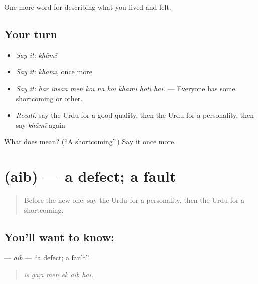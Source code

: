 \begin{grammarlens}[title={What you've built}]
One more word for describing what you lived and felt.
\end{grammarlens}

\subsection*{Your turn}
\begin{itemize}
\raggedright
  \item \emph{Say it:} \emph{khāmī}
  \item \emph{Say it:} \emph{khāmī}, once more
  \item \emph{Say it:} \emph{har insān meṅ koī na koī khāmī hotī hai.} — Everyone has some shortcoming or other.
  \item \emph{Recall:} say the Urdu for a good quality, then the Urdu for a personality, then say \emph{khāmī} again
\end{itemize}

\begin{tcolorbox}[breakable,colback=teal!4,colframe=teal!35!black,title={Before you move on}]
What does  mean? (\textquotedblleft{}A shortcoming\textquotedblright{}.) Say it once more.
\end{tcolorbox}
\section[\texorpdfstring{\ur{عیب} (aib)}{عیب (aib)}]{ (aib) — a defect; a fault}

\label{lesson:UR-C455-aib}



\begin{quote}
Before the new one: say the Urdu for a personality, then the Urdu for a shortcoming.
\end{quote}

\subsection*{You'll want to know: }
\textbf{} — \emph{aib} — \textquotedblleft{}a defect; a fault\textquotedblright{}.

\begin{quote}
     
\end{quote}

\begin{quote}
\emph{is gāṛī meṅ ek aib hai.}
\end{quote}

